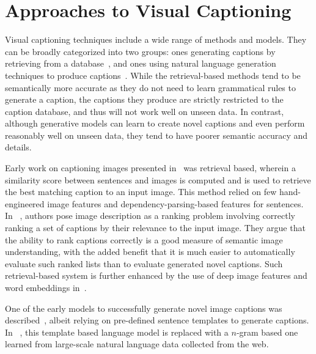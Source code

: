 \section{Approaches to Visual Captioning}
Visual captioning techniques include a wide range of methods and models.
They can be broadly categorized into two groups: ones generating captions by
retrieving from a database~\cite{Farhadi2010, Hodosh2013,Karpathy2014},
and ones using natural language generation techniques to produce
captions~\cite{Li2011,kulkarni2013babytalk,Vinyals_2015_CVPR,Fang2015}.
While the retrieval-based methods tend to be semantically more accurate as they
do not need to learn grammatical rules to generate a caption, the captions they
produce are strictly restricted to the caption database, and thus will not work
well on unseen data.
In contrast, although generative models can learn to create novel captions and
even perform reasonably well on unseen data, they tend to have poorer semantic
accuracy and details.

Early work on captioning images presented in~\cite{Farhadi2010} was retrieval
based, wherein a similarity score between sentences and images is computed and
is used to retrieve the best matching caption to an input image. 
This method relied on few hand-engineered image features and
dependency-parsing-based features for sentences.
In ~\cite{Hodosh2013}, authors pose image description as a ranking problem
involving correctly ranking a set of captions by their relevance to the input
image.
They argue that the ability to rank captions correctly is a good measure of
semantic image understanding, with the added benefit that it is much easier to
automatically evaluate such ranked lists than to evaluate generated novel
captions.
Such retrieval-based system is further enhanced by the use of deep image
features and word embeddings in~\cite{Karpathy2014}.

One of the early models to successfully generate novel image captions was
described~\cite{kulkarni2013babytalk}, albeit relying on pre-defined sentence
templates to generate captions.
In ~\cite{Li2011}, this template based language model is replaced with a
$n$-gram based one learned from large-scale natural language data collected from
the web.

